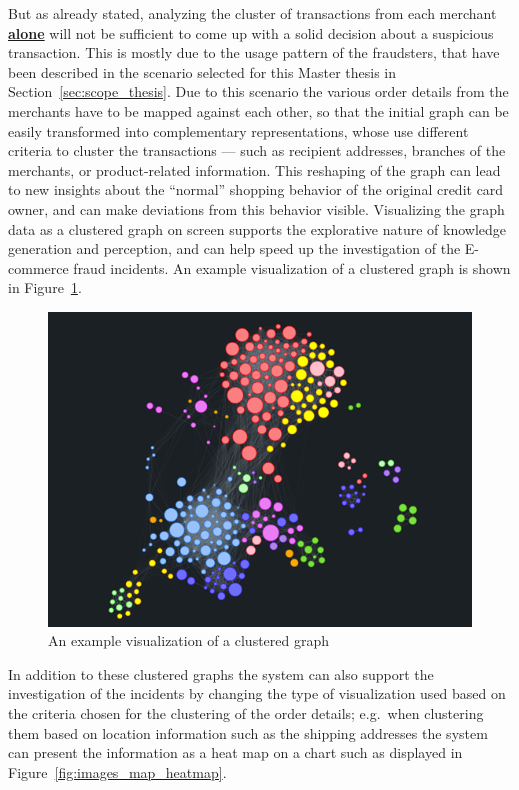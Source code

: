 But as already stated, analyzing the cluster of transactions from each merchant \textbf{\underline{alone}} will not be sufficient to come up with a solid decision about a suspicious transaction. This is mostly due to the usage pattern of the fraudsters, that have been described in the scenario selected for this Master thesis in Section~\ref{sec:scope_thesis}. Due to this scenario the various order details from the merchants have to be mapped against each other, so that the initial graph can be easily transformed into complementary representations, whose use different criteria to cluster the transactions --- such as recipient addresses, branches of the merchants, or product-related information. This reshaping of the graph can lead to new insights about the ``normal'' shopping behavior of the original credit card owner, and can make deviations from this behavior visible. Visualizing the graph data as a clustered graph on screen supports the explorative nature of knowledge generation and perception, and can help speed up the investigation of the \gls{E-commerce} fraud incidents. An example visualization of a clustered graph is shown in Figure~\ref{fig:images_graph_viz}. \\

\begin{figure}[!ht]
  \centering
  \includegraphics[width=0.9\columnwidth]{images/GraphViz.png}
  \caption{An example visualization of a clustered graph \citep{visjsshowcase}}
\label{fig:images_graph_viz}
\end{figure}

 In addition to these clustered graphs the system can also support the investigation of the incidents by changing the type of visualization used based on the criteria chosen for the clustering of the order details; e.g.\ when clustering them based on location information such as the shipping addresses the system can present the information as a heat map on a chart such as displayed in Figure~\ref{fig:images_map_heatmap}. \@

